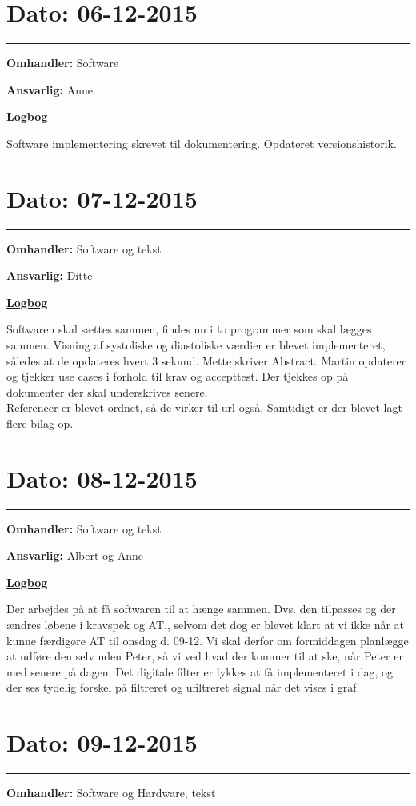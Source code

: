 \section{Dato: 06-12-2015}
\hrule
\textbf{Omhandler:} Software

\textbf{Ansvarlig:} Anne 

\underline{\textbf{Logbog}}

Software implementering skrevet til dokumentering. Opdateret versionshistorik.   
\\

\section{Dato: 07-12-2015}
\hrule
\textbf{Omhandler:} Software og tekst

\textbf{Ansvarlig:} Ditte 

\underline{\textbf{Logbog}}

Softwaren skal sættes sammen, findes nu i to programmer som skal lægges sammen. Visning af systoliske og diastoliske værdier er blevet implementeret, således at de opdateres hvert 3 sekund. 
Mette skriver Abstract. 
Martin opdaterer og tjekker use cases i forhold til krav og accepttest. Der tjekkes op på dokumenter der skal underskrives senere. \\Referencer er blevet ordnet, så de virker til url også. Samtidigt er der blevet lagt flere bilag op.  
\\

\section{Dato: 08-12-2015}
\hrule
\textbf{Omhandler:} Software og tekst

\textbf{Ansvarlig:} Albert og Anne

\underline{\textbf{Logbog}}

Der arbejdes på at få softwaren til at hænge sammen. Dvs. den tilpasses og der ændres løbene i kravspek og AT., selvom det dog er blevet klart at vi ikke når at kunne færdigøre AT til onsdag d. 09-12. Vi skal derfor om formiddagen planlægge at udføre den selv uden Peter, så vi ved hvad der kommer til at ske, når Peter er med senere på dagen.
Det digitale filter er lykkes at få implementeret i dag, og der ses tydelig forskel på filtreret og ufiltreret signal når det vises i graf.  
\\

\section{Dato: 09-12-2015}
\hrule
\textbf{Omhandler:} Software og Hardware, tekst

